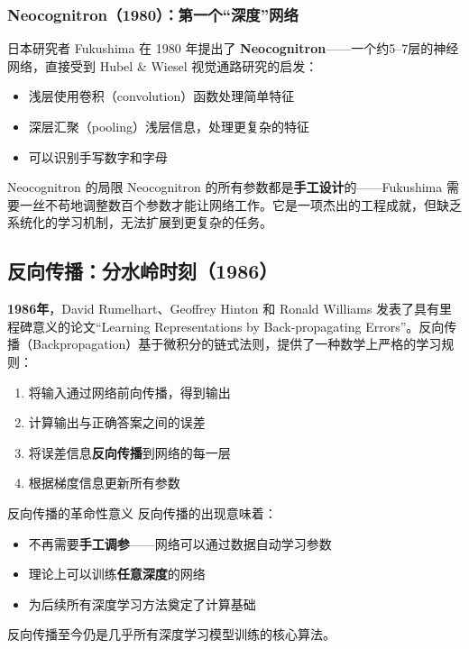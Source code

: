 \documentclass[a4paper]{article}
\begin{document}
\subsubsection{Neocognitron（1980）：第一个``深度''网络}

日本研究者 Fukushima 在 1980 年提出了 \textbf{Neocognitron}——一个约5--7层的神经网络，直接受到 Hubel \& Wiesel 视觉通路研究的启发：

\begin{itemize}
    \item 浅层使用卷积（convolution）函数处理简单特征
    \item 深层汇聚（pooling）浅层信息，处理更复杂的特征
    \item 可以识别手写数字和字母
\end{itemize}

\begin{warningbox}{Neocognitron 的局限}
Neocognitron 的所有参数都是\textbf{手工设计}的——Fukushima 需要一丝不苟地调整数百个参数才能让网络工作。它是一项杰出的工程成就，但缺乏系统化的学习机制，无法扩展到更复杂的任务。
\end{warningbox}

\subsection{反向传播：分水岭时刻（1986）}

\textbf{1986年}，David Rumelhart、Geoffrey Hinton 和 Ronald Williams 发表了具有里程碑意义的论文``Learning Representations by Back-propagating Errors''。反向传播（Backpropagation）基于微积分的链式法则，提供了一种数学上严格的学习规则：

\begin{enumerate}
    \item 将输入通过网络前向传播，得到输出
    \item 计算输出与正确答案之间的误差
    \item 将误差信息\textbf{反向传播}到网络的每一层
    \item 根据梯度信息更新所有参数
\end{enumerate}

\begin{importantbox}{反向传播的革命性意义}
反向传播的出现意味着：
\begin{itemize}
    \item 不再需要\textbf{手工调参}——网络可以通过数据自动学习参数
    \item 理论上可以训练\textbf{任意深度}的网络
    \item 为后续所有深度学习方法奠定了计算基础
\end{itemize}
反向传播至今仍是几乎所有深度学习模型训练的核心算法。
\end{importantbox}
\end{document}
